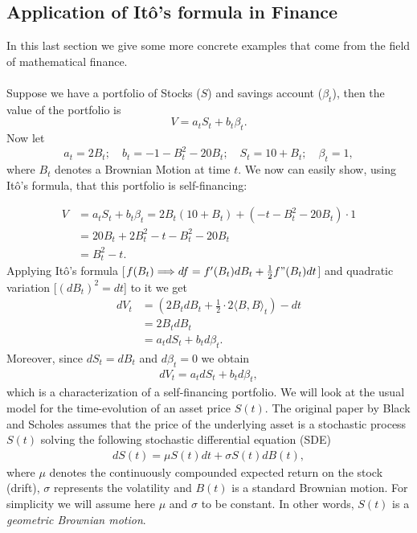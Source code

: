 \documentclass[11pt,a4paper, final]{article}
\begin{document}
\subsection{Application of Itô's formula in Finance}
In this last section we give some more concrete examples that come from the field of mathematical finance.  \\
\\
Suppose we have a portfolio of Stocks ($S$) and savings account ($\beta_t$), then the value of the portfolio is
$$ V=a_t S_t + b_t \beta_t. $$
Now let $$a_t=2 B_t;\quad b_t=-1-B_t^2-20 B_t;\quad S_t=10+B_t;\quad \beta_t=1,$$
where $B_t$ denotes a Brownian Motion at time $t$.
We now can easily show, using Itô's formula, that this portfolio is self-financing:

\begin{align*} V&=a_t S_t + b_t \beta_t = 2 B_t(10+B_t) +(-t-B_t^2-20B_t)\cdot 1\\
&=20B_t + 2B_t^2-t-B_t^2-20B_t \\
&=B_t^2-t. 
\end{align*}
Applying Itô's formula [$f(B_t) \Longrightarrow df=f'(B_t)dB_t + \frac{1}{2} f"(B_t)dt$] and quadratic variation [$(dB_t)^2=dt$] to it we get
\begin{align*}  dV_t &= (2B_t dB_t + \frac{1}{2}\cdot 2 \langle B, B \rangle_t)-dt\\
&= 2 B_t dB_t\\
&= a_t dS_t + b_t d\beta_t.
\end{align*}
Moreover, since $dS_t = dB_t$ and $d\beta_t=0$ we obtain
\begin{align*}
dV_t = a_t dS_t + b_t d\beta_t, 
\end{align*}
which is a characterization of a self-financing portfolio.
\newpage
\noindent We will look at the usual model for the time-evolution of an asset price $S(t)$.
The original paper by Black and Scholes assumes that the price of the underlying asset is a stochastic process $S(t)$ solving the following stochastic differential equation (SDE)
\begin{align*}
dS(t)=\mu S(t) dt + \sigma S(t) dB(t),
\end{align*}
where $\mu$ denotes the continuously compounded expected return on the stock (drift), $\sigma$ represents the volatility and $B(t)$ is a standard Brownian motion. For simplicity we will assume here $\mu$ and $\sigma$ to be constant. 
In other words, $S(t)$ is a \textit{geometric Brownian motion}.\\
\\
\end{document}
